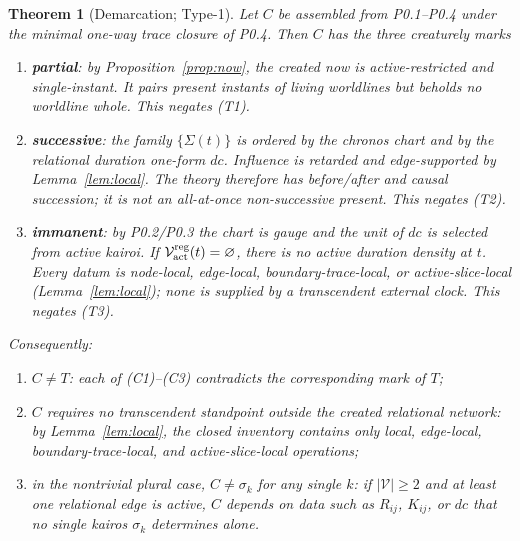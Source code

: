 \documentclass[11pt,a4paper]{article}
\def\mathfrak#1{#1}%
\theoremstyle{definition}
\theoremstyle{plain}
\newtheorem{theorem}[definition]{Theorem}
\theoremstyle{remark}
\begin{document}
\begin{theorem}[Demarcation; Type-1]\label{thm:demarc}
Let \(C\) be assembled from P0.1--P0.4 under the minimal one-way trace closure of P0.4.
Then \(C\) has the three creaturely marks
\begin{enumerate}[label=\textup{(C\arabic*)},leftmargin=1.25cm]
\item \textbf{partial}: by Proposition~\ref{prop:now}, the created now is
active-restricted and single-instant. It pairs present instants of living worldlines but
beholds no worldline whole. This negates (T1).

\item \textbf{successive}: the family \(\{\Sigma(t)\}\) is ordered by the chronos chart
and by the relational duration one-form \(d\mathfrak c\). Influence is retarded and
edge-supported by Lemma~\ref{lem:local}. The theory therefore has before/after and causal
succession; it is not an all-at-once non-successive present. This negates (T2).

\item \textbf{immanent}: by P0.2/P0.3 the chart is gauge and the unit of \(d\mathfrak c\)
is selected from active kairoi. If \(\mathcal V_{\rm act}^{\rm reg}(t)=\varnothing\), there
is no active duration density at \(t\). Every datum is node-local, edge-local,
boundary-trace-local, or active-slice-local (Lemma~\ref{lem:local}); none is supplied by
a transcendent external clock. This negates (T3).
\end{enumerate}
Consequently:
\begin{enumerate}[label=\textup{(\alph*)},leftmargin=1.2cm]
\item \(C\neq T\): each of (C1)--(C3) contradicts the corresponding mark of \(T\);
\item \(C\) requires no transcendent standpoint outside the created relational network:
by Lemma~\ref{lem:local}, the closed inventory contains only local, edge-local,
boundary-trace-local, and active-slice-local operations;
\item in the nontrivial plural case, \(C\neq\sigma_k\) for any single \(k\): if
\(|\mathcal V|\ge2\) and at least one relational edge is active, \(C\) depends on data
such as \(R_{ij}\), \(K_{ij}\), or \(d\mathfrak c\) that no single kairos \(\sigma_k\)
determines alone.
\end{enumerate}
\end{theorem}
\end{document}
